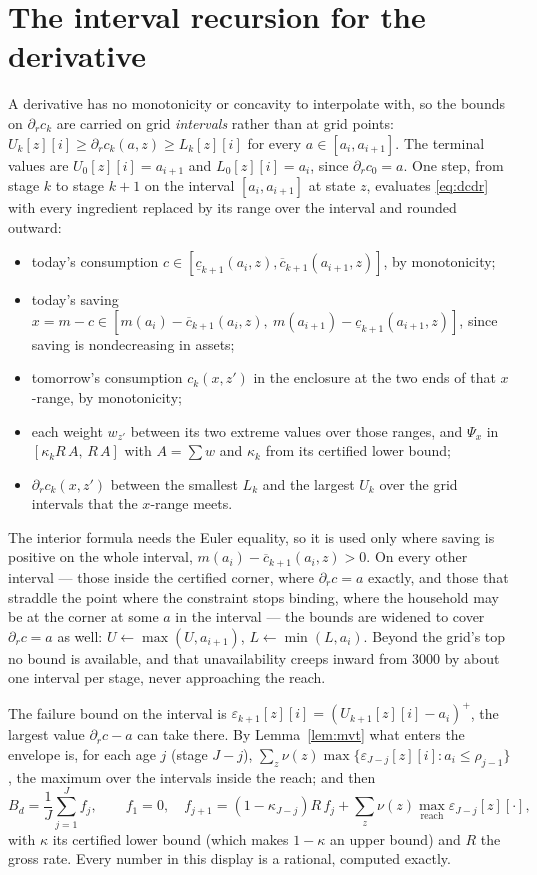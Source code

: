 \documentclass[11pt]{article}
\theoremstyle{definition}
\theoremstyle{remark}
\begin{document}
\section{The interval recursion for the derivative}\label{sec:recursion}

A derivative has no monotonicity or concavity to interpolate with, so the bounds on $\partial_rc_k$
are carried on grid \emph{intervals} rather than at grid points: $U_k[z][i]\ge\partial_rc_k(a,z)\ge
L_k[z][i]$ for every $a\in[a_i,a_{i+1}]$. The terminal values are $U_0[z][i]=a_{i+1}$ and
$L_0[z][i]=a_i$, since $\partial_rc_0=a$. One step, from stage $k$ to stage $k+1$ on the interval
$[a_i,a_{i+1}]$ at state $z$, evaluates \eqref{eq:dcdr} with every ingredient replaced by its range
over the interval and rounded outward:
\begin{itemize}[leftmargin=1.5em,itemsep=2pt]
\item today's consumption $c\in[\underline c_{k+1}(a_i,z),\overline c_{k+1}(a_{i+1},z)]$, by
  monotonicity;
\item today's saving $x=m-c\in[m(a_i)-\overline c_{k+1}(a_i,z),\ m(a_{i+1})-\underline c_{k+1}(a_{i+1},z)]$,
  since saving is nondecreasing in assets;
\item tomorrow's consumption $c_k(x,z')$ in the enclosure at the two ends of that $x$-range, by
  monotonicity;
\item each weight $w_{z'}$ between its two extreme values over those ranges, and $\Psi_x$ in
  $[\kappa_kR\,A,\,R\,A]$ with $A=\sum w$ and $\kappa_k$ from its certified lower bound;
\item $\partial_rc_k(x,z')$ between the smallest $L_k$ and the largest $U_k$ over the grid intervals
  that the $x$-range meets.
\end{itemize}
The interior formula needs the Euler equality, so it is used only where saving is positive on the
whole interval, $m(a_i)-\overline c_{k+1}(a_i,z)>0$. On every other interval --- those inside the
certified corner, where $\partial_rc=a$ exactly, and those that straddle the point where the
constraint stops binding, where the household may be at the corner at some $a$ in the interval ---
the bounds are widened to cover $\partial_rc=a$ as well: $U\leftarrow\max(U,a_{i+1})$,
$L\leftarrow\min(L,a_i)$. Beyond the grid's top no bound is available, and that unavailability
creeps inward from $3000$ by about one interval per stage, never approaching the reach.

The failure bound on the interval is $\varepsilon_{k+1}[z][i]=(U_{k+1}[z][i]-a_i)^+$, the largest
value $\partial_rc-a$ can take there. By Lemma~\ref{lem:mvt} what enters the envelope is, for each
age $j$ (stage $J-j$), $\sum_z\nu(z)\max\{\varepsilon_{J-j}[z][i]:a_i\le\rho_{j-1}\}$, the maximum
over the intervals inside the reach; and then
\[
  B_d=\frac1J\sum_{j=1}^{J}f_j,\qquad f_1=0,\quad
  f_{j+1}=(1-\kappa_{J-j})R\,f_j+\sum_z\nu(z)\max_{\text{reach}}\varepsilon_{J-j}[z][\cdot],
\]
with $\kappa$ its certified lower bound (which makes $1-\kappa$ an upper bound) and $R$ the gross
rate. Every number in this display is a rational, computed exactly.
\end{document}
